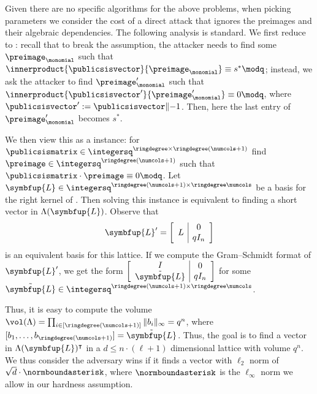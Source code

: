 Given there are no specific algorithms for the above problems, when picking parameters we consider the cost of a direct \sis attack that ignores the preimages and their algebraic dependencies. The following analysis is standard. We first reduce \risis to \rsis: 
recall that to break the assumption, 
the attacker needs to find some $\preimage_{\monomial}$ such that 
$\innerproduct{\publicsisvector}{\preimage_{\monomial}} \equiv s^* \modq$;
instead, we ask the attacker to find $\preimage_{\monomial}'$ such that $\innerproduct{\publicsisvector'}{\preimage_{\monomial}'} \equiv 0 \modq$, where $\publicsisvector' := \publicsisvector \| {-}1$. Then, here the last entry of $\preimage_{\monomial}'$ becomes $s^*$.

We then view this as a \sis instance: for $\publicsismatrix \in \integersq^{\ringdegree \times \ringdegree (\numcols + 1)}$ find $\preimage \in \integersq^{\ringdegree (\numcols + 1)}$ such that $\publicsismatrix\cdot\preimage \equiv 0 \modq$. Let $\symbfup{L} \in \integersq^{\ringdegree(\numcols+1)\times \ringdegree\numcols}$ be a basis for the right kernel of \publicsismatrix. Then solving this \sis instance is equivalent to finding a short vector in $\Lambda(\symbfup{L})$. Observe that 
\[
\symbfup{L}' =
\left[   
\begin{array}{c|c}
L & \begin{matrix} 0 \\ qI_{n} \end{matrix} \\
\end{array}
\right]   
\]
is an equivalent basis for this lattice.
If we compute the Gram–Schmidt format of $\symbfup{L}'$,
we get the form
$
\left[ 
\begin{array}{c|c}
\begin{matrix} I \\ \tilde{\symbfup{L}} \end{matrix} & \begin{matrix} 0 \\ qI_{n} \end{matrix} \\
\end{array}
\right]
$
for some $\tilde{\symbfup{L}} \in \integersq^{\ringdegree(\numcols+1)\times \ringdegree\numcols}$.

Thus, it is easy to compute the volume $\vol(\Lambda) = \prod_{i\in [\ringdegree(\numcols+1)]}\|b_i\|_\infty = q^n$,
where $[b_1, \dots, b_{\ringdegree(\numcols + 1)}] = \tilde{\symbfup{L}}$.
Thus, the goal is to find a vector in $\Lambda(\symbfup{L})^\intercal$
in a $d \leq n\cdot(\ell + 1)$ dimensional lattice with volume $q^n$.
We thus consider the adversary wins if it finds a vector with $\ell_2$ norm of
$\sqrt{d}\cdot \normboundasterisk$,
where $\normboundasterisk$ is the $\ell_\infty$ norm we allow in our hardness assumption.

